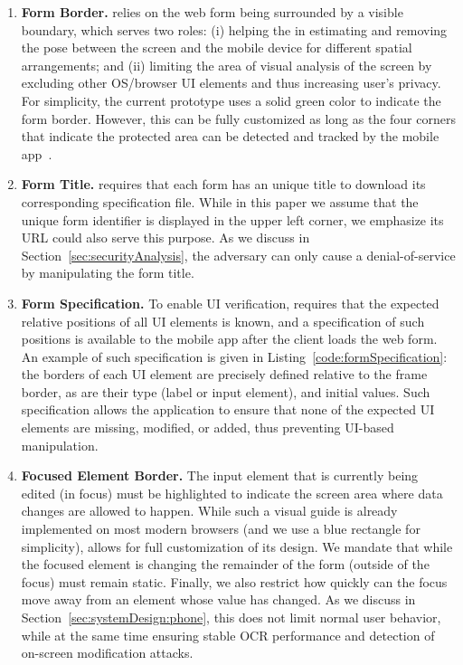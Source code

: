 \begin{enumerate}
	\item[\one] \textbf{Form Border.}
	\sysname relies on the web form being surrounded by a visible boundary, which serves two roles:
	(i) helping the \app in estimating and removing the pose between the screen and the mobile device for different spatial arrangements; and
	(ii) limiting the area of visual analysis of the screen by excluding other OS/browser UI elements and thus increasing user's privacy.
	For simplicity, the current prototype uses a solid green color to indicate the form border.
	However, this can be fully customized as long as the four corners that indicate the protected area can be detected and tracked by the mobile app~\cite{zhang2002visual}.


	\item[\two] \textbf{Form Title.} \sysname requires that each form has an unique title to download its corresponding specification file.
	While in this paper we assume that the unique form identifier is displayed in the upper left corner, we emphasize its URL could also serve this purpose.
	As we discuss in Section~\ref{sec:securityAnalysis}, the adversary can only cause a denial-of-service by manipulating the form title.

	\item[\three] \textbf{Form Specification.}
	To enable UI verification, \sysname requires that the expected relative positions of all UI elements is known, and a specification of such positions is available to the mobile app after the client loads the web form.
	An example of such specification is given in Listing~\ref{code:formSpecification}: the borders of each UI element are precisely defined relative to the frame border, as are their type (label or input element), and initial values.
	Such specification allows the application to ensure that none of the expected UI elements are missing, modified, or added, thus preventing UI-based manipulation.

	\item[\four] \textbf{Focused Element Border.}
	The input element that is currently being edited (in focus) must be highlighted to indicate the screen area where data changes are allowed to happen.
	While such a visual guide is already implemented on most modern browsers (and we use a blue rectangle for simplicity), \sysname allows for full customization of its design.
	We mandate that while the focused element is changing the remainder of the form (outside of the focus) must remain static.
	Finally, we also restrict how quickly can the focus move away from an element whose value has changed.
	As we discuss in Section~\ref{sec:systemDesign:phone}, this does not limit normal user behavior, while at the same time ensuring stable OCR performance and detection of on-screen modification attacks.


\end{enumerate}
